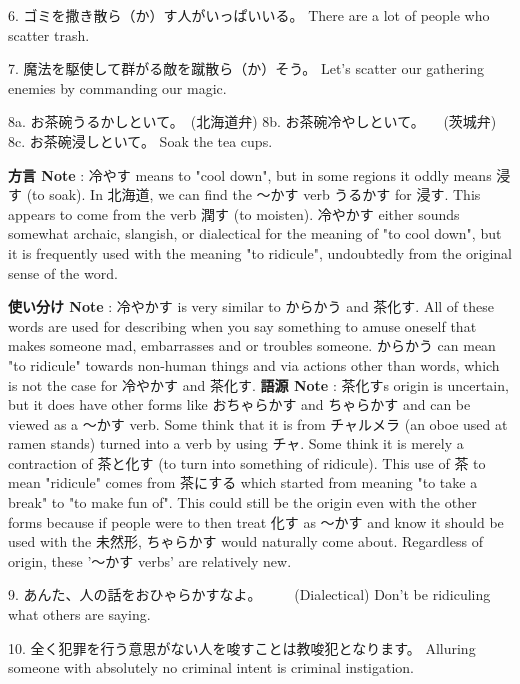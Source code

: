 \par{6. ゴミを撒き散ら（か）す人がいっぱいいる。 \hfill\break
There are a lot of people who scatter trash. }

\par{7. 魔法を駆使して群がる敵を蹴散ら（か）そう。 \hfill\break
Let's scatter our gathering enemies by commanding our magic. }

\par{8a. お茶碗うるかしといて。　(北海道弁) \hfill\break
8b. お茶碗冷やしといて。 　(茨城弁) \hfill\break
8c. お茶碗浸しといて。 \hfill\break
Soak the tea cups. }

\par{\textbf{方言 Note }: 冷やす means to "cool down", but in some regions it oddly means 浸す (to soak). In 北海道, we can find the ～かす verb うるかす for 浸す. This appears to come from the verb 潤す (to moisten). 冷やかす either sounds somewhat archaic, slangish, or dialectical for the meaning of "to cool down", but it is frequently used with the meaning "to ridicule", undoubtedly from the original sense of the word. }

\par{\textbf{使い分け Note }: 冷やかす is very similar to からかう and 茶化す. All of these words are used for describing when you say something to amuse oneself that makes someone mad, embarrasses and or troubles someone. からかう can mean "to ridicule" towards non-human things and via actions other than words, which is not the case for 冷やかす and 茶化す. \hfill\break
\hfill\break
\textbf{語源 Note }: 茶化す\textquotesingle s origin is uncertain, but it does have other forms like おちゃらかす and ちゃらかす and can be viewed as a ～かす verb. Some think that it is from チャルメラ (an oboe used at ramen stands) turned into a verb by using チャ. Some think it is merely a contraction of 茶と化す (to turn into something of ridicule). This use of 茶 to mean "ridicule" comes from 茶にする which started from meaning "to take a break" to "to make fun of". This could still be the origin even with the other forms because if people were to then treat 化す as ～かす and know it should be used with the 未然形, ちゃらかす would naturally come about. Regardless of origin, these '～かす verbs' are relatively new. }

\par{9. あんた、人の話をおひゃらかすなよ。 　　(Dialectical) \hfill\break
Don't be ridiculing what others are saying. }

\par{10. 全く犯罪を行う意思がない人を唆すことは教唆犯となります。 \hfill\break
Alluring someone with absolutely no criminal intent is criminal instigation. }

